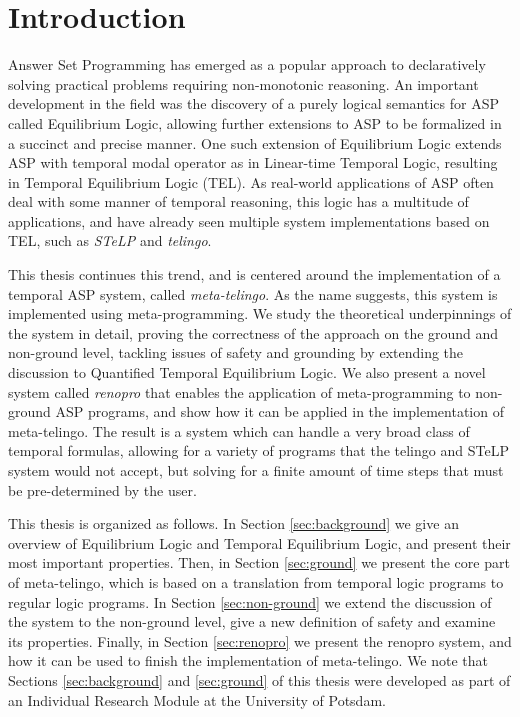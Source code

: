 \section{Introduction   }
\label{sec:introduction}

Answer Set Programming\cite{martru99a}\cite{niemela99a} has emerged as
a popular approach to declaratively solving practical problems
requiring non-monotonic reasoning. An important development in the
field was the discovery of a purely logical semantics for ASP called
Equilibrium Logic\cite{pearce06a}, allowing further extensions to ASP
to be formalized in a succinct and precise manner. One such extension
of Equilibrium Logic extends ASP with temporal modal operator as in
Linear-time Temporal Logic\cite{pnueli77a}, resulting in Temporal
Equilibrium Logic (TEL)\cite{cabveg07a}. As real-world applications of
ASP often deal with some manner of temporal reasoning, this logic has
a multitude of applications, and have already seen multiple system
implementations based on TEL, such as \emph{STeLP}\cite{cabdie11a} and
\emph{telingo}\cite{cakamosc19a}.

This thesis continues this trend, and is centered around the
implementation of a temporal ASP system, called
\emph{meta-telingo}. As the name suggests, this system is implemented
using meta-programming. We study the theoretical underpinnings of the
system in detail, proving the correctness of the approach on the
ground and non-ground level, tackling issues of safety and grounding
by extending the discussion to Quantified Temporal Equilibrium
Logic\cite{agcapevidi17a}. We also present a novel system called
\emph{renopro} that enables the application of meta-programming to
non-ground ASP programs, and show how it can be applied in the
implementation of meta-telingo. The result is a system which can
handle a very broad class of temporal formulas, allowing for a variety
of programs that the telingo and STeLP system would not accept, but
solving for a finite amount of time steps that must be pre-determined by the
user.

This thesis is organized as follows. In Section \ref{sec:background}
we give an overview of Equilibrium Logic and Temporal Equilibrium
Logic, and present their most important properties. Then, in Section
\ref{sec:ground} we present the core part of meta-telingo, which is
based on a translation from temporal logic programs to regular logic
programs. In Section \ref{sec:non-ground} we extend the discussion of
the system to the non-ground level, give a new definition of safety
and examine its properties. Finally, in Section \ref{sec:renopro} we
present the renopro system, and how it can be used to finish the
implementation of meta-telingo. We note that Sections
\ref{sec:background} and \ref{sec:ground} of this thesis were
developed as part of an Individual Research Module at the University
of Potsdam.
